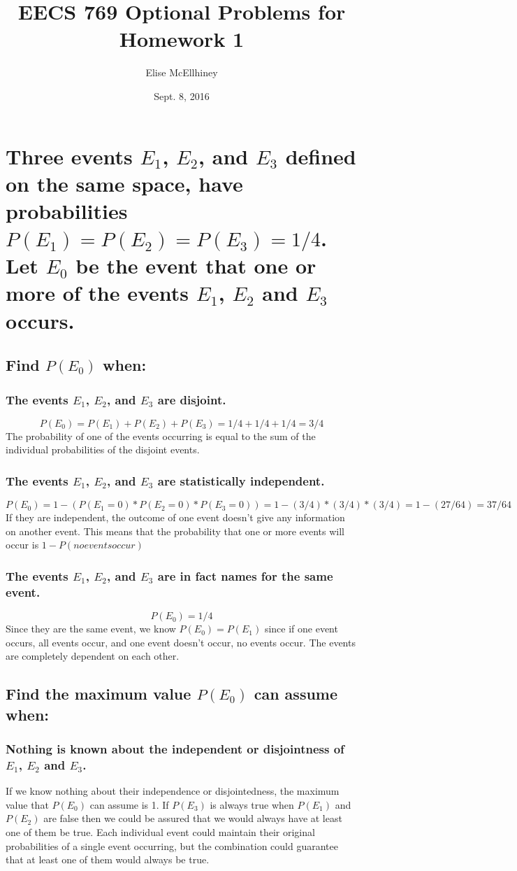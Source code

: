 \documentclass[11pt, oneside]{book}   	%
\title{EECS 769 Optional Problems for Homework 1}
\author{Elise McEllhiney}
\date{Sept. 8, 2016}							%
\begin{document}
\maketitle
\section{Three events $E_1$, $E_2$, and $E_3$ defined on the same space, have probabilities $P(E_1) = P(E_2) = P(E_3) = 1/4$.  Let $E_0$ be the event that one or more of the events $E_1$, $E_2$ and $E_3$ occurs.}
\subsection{Find $P(E_0)$ when:}
\subsubsection{The events $E_1$, $E_2$, and $E_3$ are disjoint.}
$$P(E_0)=P(E_1)+P(E_2)+P(E_3)=1/4 + 1/4+ 1/4 = 3/4$$
The probability of one of the events occurring is equal to the sum of the individual probabilities of the disjoint events.
\subsubsection{The events $E_1$, $E_2$, and $E_3$ are statistically independent.}
$$P(E_0) = 1 - (P(E_1=0)*P(E_2=0)*P(E_3=0)) = 1-(3/4)*(3/4)*(3/4) = 1-(27/64) = 37/64$$
If they are independent, the outcome of one event doesn't give any information on another event.  This means that the probability that one or more events will occur is $1-P(no events occur)$
\subsubsection{The events $E_1$, $E_2$, and $E_3$ are in fact names for the same event.}
$$P(E_0) = 1/4$$
Since they are the same event, we know $P(E_0)=P(E_1)$ since if one event occurs, all events occur, and one event doesn't occur, no events occur.  The events are completely dependent on each other.
\subsection{Find the maximum value $P(E_0)$ can assume when:}
\subsubsection{Nothing is known about the independent or disjointness of $E_1$, $E_2$ and $E_3$.}
If we know nothing about their independence or disjointedness, the maximum value that $P(E_0)$ can assume is 1.  If $P(E_3)$ is always true when $P(E_1)$ and $P(E_2)$ are false then we could be assured that we would always have at least one of them be true.  Each individual event could maintain their original probabilities of a single event occurring, but the combination could guarantee that at least one of them would always be true. 
\end{document}

